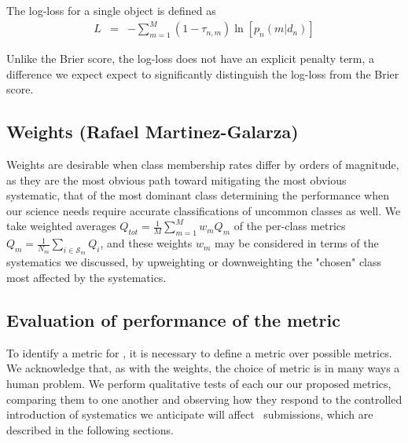 The log-loss for a single object is defined as
\begin{eqnarray}
L &=& -\sum_{m=1}^{M}(1-\tau_{n, m})\ln[p_{n}(m | d_{n})]
\end{eqnarray}

Unlike the Brier score, the log-loss does not have an explicit penalty term, a difference we expect expect to significantly distinguish the log-loss from the Brier score.

%

\subsection{Weights (Rafael Martinez-Galarza)}
\label{sec:weights}


Weights are desirable when class membership rates differ by orders of magnitude, as they are the most obvious path toward mitigating the most obvious systematic, that of the most dominant class determining the performance when our science needs require accurate classifications of uncommon classes as well.
We take weighted averages $Q_{tot} = \frac{1}{M}\sum_{m=1}^{M}w_{m}Q_{m}$ of the per-class metrics $Q_{m} = \frac{1}{N_{m}}\sum_{i\in\mathcal{S}_{m}}Q_{i}$, and these weights $w_{m}$ may be considered in terms of the systematics we discussed, by upweighting or downweighting the "chosen" class most affected by the systematics.

\subsection{Evaluation of performance of the metric}
\label{sec:inception}

To identify a metric for \plasticc, it is necessary to define a metric over possible metrics.
We acknowledge that, as with the weights, the choice of metric is in many ways a human problem.
We perform qualitative tests of each our our proposed metrics, comparing them to one another and observing how they respond to the controlled introduction of systematics we anticipate will affect \plasticc\ submissions, which are described in the following sections.
